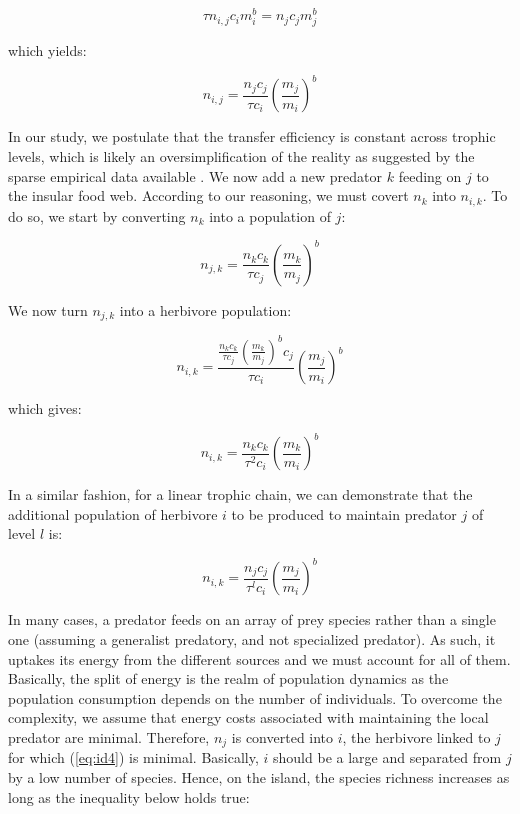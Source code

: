 \begin{equation} \tau n_{i,j} c_im_i^b = n_jc_jm_j^b \label{eq:id1}\end{equation}

which yields:

\begin{equation} n_{i,j} = \frac{n_jc_j}{\tau c_i} \left( \frac{m_j}{m_i} \right)^b \label{eq:id2}\end{equation}

In our study, we postulate that the transfer efficiency is constant
across trophic levels, which is likely an oversimplification of the
reality as suggested by the sparse empirical data available
\citep{Trebilco2013, Brown2003}. We now add a new predator \(k\) feeding
on \(j\) to the insular food web. According to our reasoning, we must
covert \(n_k\) into \(n_{i,k}\). To do so, we start by converting
\(n_k\) into a population of \(j\):

\begin{equation} n_{j,k} = \frac{n_kc_k}{\tau c_j} \left( \frac{m_k}{m_j} \right)^b \label{eq:id2}\end{equation}

We now turn \(n_{j,k}\) into a herbivore population:

\begin{equation} n_{i,k} = \frac{\frac{n_kc_k}{\tau c_j} \left( \frac{m_k}{m_j} \right)^bc_j}{\tau c_i} \left( \frac{m_j}{m_i} \right)^b \label{eq:id3}\end{equation}

which gives:

\begin{equation} n_{i,k} = \frac{n_kc_k}{\tau^2 c_i} \left( \frac{m_k}{m_i} \right)^b \label{eq:id3b}\end{equation}

In a similar fashion, for a linear trophic chain, we can demonstrate
that the additional population of herbivore \(i\) to be produced to
maintain predator \(j\) of level \(l\) is:

\begin{equation} n_{i,k} = \frac{n_jc_j}{\tau^l c_i} \left( \frac{m_j}{m_i} \right)^b \label{eq:id4}\end{equation}

In many cases, a predator feeds on an array of prey species rather than
a single one (assuming a generalist predatory, and not specialized
predator). As such, it uptakes its energy from the different sources and
we must account for all of them. Basically, the split of energy is the
realm of population dynamics as the population consumption depends on
the number of individuals. To overcome the complexity, we assume that
energy costs associated with maintaining the local predator are minimal.
Therefore, \(n_j\) is converted into \(i\), the herbivore linked to
\(j\) for which (\ref{eq:id4}) is minimal. Basically, \(i\) should be a
large and separated from \(j\) by a low number of species. Hence, on the
island, the species richness increases as long as the inequality below
holds true:

